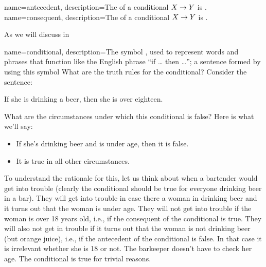 {
	name=antecedent,
	description={The   of a conditional $X\rightarrow Y$ is \metaX.}
}
{
	name=consequent,
	description={The   of a conditional $X\rightarrow Y$ is \metaY.}
}

As we will discuss in 





{
name=conditional,
description={The symbol \eif, used to represent words and phrases that function like the English phrase ``if \ldots{} then \ldots''; a sentence formed by using this symbol}
}
What are the truth rules for the conditional? Consider the sentence:
\begin{earg}
\item[\ex{bartender}] If she is drinking a beer, then she is over eighteen.
\end{earg}
What are the circumstances under which this conditional is false?
Here is what we'll say:
\begin{itemize}
\item If she's drinking beer and is under age, then it is false.
\item It is true in all other circumstances.
\end{itemize}
To understand the rationale for this, let us think about when a bartender would get into trouble (clearly the conditional should be true for everyone drinking beer in a bar). They will get into trouble in case there a woman in drinking beer and it turns out that the woman is under age. They will not get into trouble if the woman is over 18 years old, i.e., if the consequent of the conditional is true. They will also not get in trouble if it turns out that the woman is not drinking beer (but orange juice), i.e., if the antecedent of the conditional is false.  In that case it is irrelevant whether she is 18 or not. The barkeeper doesn't have to check her age. The conditional is true for trivial reasons.


